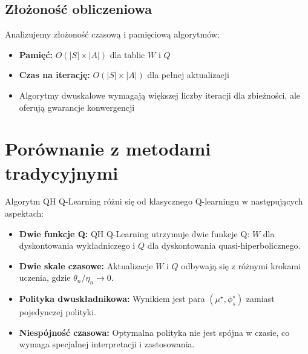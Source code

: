 \subsection{Złożoność obliczeniowa}

Analizujemy złożoność czasową i pamięciową algorytmów:
\begin{itemize}
\item \textbf{Pamięć:} $O(|S| \times |A|)$ dla tablic $W$ i $Q$
\item \textbf{Czas na iterację:} $O(|S| \times |A|)$ dla pełnej aktualizacji
\item Algorytmy dwuskalowe wymagają większej liczby iteracji dla zbieżności, ale oferują gwarancje konwergencji
\end{itemize}

\section{Porównanie z metodami tradycyjnymi}

Algorytm QH Q-Learning różni się od klasycznego Q-learningu w następujących aspektach:

\begin{itemize}
\item \textbf{Dwie funkcje Q:} QH Q-Learning utrzymuje dwie funkcje Q: $W$ dla dyskontowania wykładniczego i $Q$ dla dyskontowania quasi-hiperbolicznego.
\item \textbf{Dwie skale czasowe:} Aktualizacje $W$ i $Q$ odbywają się z różnymi krokami uczenia, gdzie $\theta_n / \eta_n \to 0$.
\item \textbf{Polityka dwuskładnikowa:} Wynikiem jest para $(\mu^\star, \phi_s^\star)$ zamiast pojedynczej polityki.
\item \textbf{Niespójność czasowa:} Optymalna polityka nie jest spójna w czasie, co wymaga specjalnej interpretacji i zastosowania.
\end{itemize}
